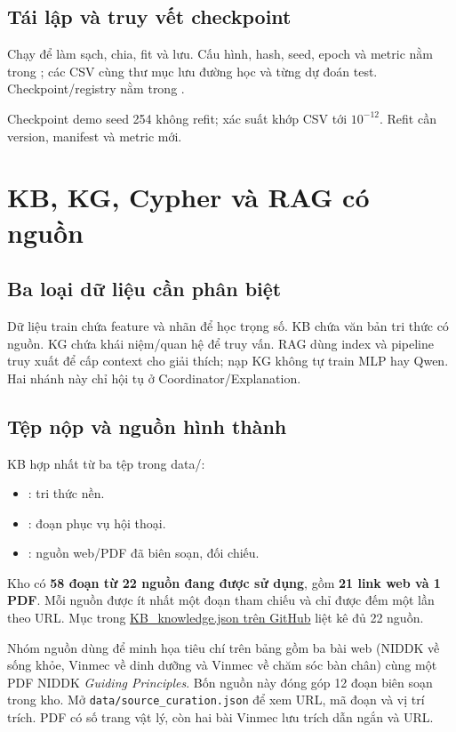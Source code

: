 \section{Tái lập và truy vết checkpoint}
Chạy  để làm sạch, chia, fit và lưu. Cấu hình, hash, seed, epoch và metric nằm trong ; các CSV cùng thư mục lưu đường học và từng dự đoán test. Checkpoint/registry nằm trong .

Checkpoint demo seed 254 không refit; xác suất khớp CSV tới $10^{-12}$. Refit cần version, manifest và metric mới.

\chapter{KB, KG, Cypher và RAG có nguồn}\label{pr:knowledge}
\section{Ba loại dữ liệu cần phân biệt}
Dữ liệu train chứa feature và nhãn để học trọng số. KB chứa văn bản tri thức có nguồn. KG chứa khái niệm/quan hệ để truy vấn. RAG dùng index và pipeline truy xuất để cấp context cho giải thích; nạp KG không tự train MLP hay Qwen. Hai nhánh này chỉ hội tụ ở Coordinator/Explanation.

\section{Tệp nộp và nguồn hình thành}
KB hợp nhất từ ba tệp trong data/:
\begin{itemize}
\item {}: tri thức nền.
\item {}: đoạn phục vụ hội thoại.
\item {}: nguồn web/PDF đã biên soạn, đối chiếu.
\end{itemize}
Kho có \textbf{58 đoạn từ 22 nguồn đang được sử dụng}, gồm \textbf{21 link web và 1 PDF}. Mỗi nguồn được ít nhất một đoạn tham chiếu và chỉ được đếm một lần theo URL. Mục  trong \href{https://github.com/jellalaz/He_Thong_Thong_Minh_Thay_Que/blob/main/exports/KB_KG_RAG/KB_knowledge.json}{KB\_knowledge.json trên GitHub} liệt kê đủ 22 nguồn.

Nhóm nguồn dùng để minh họa tiêu chí trên bảng gồm ba bài web (NIDDK về sống khỏe, Vinmec về dinh dưỡng và Vinmec về chăm sóc bàn chân) cùng một PDF NIDDK \emph{Guiding Principles}. Bốn nguồn này đóng góp 12 đoạn biên soạn trong kho. Mở \nolinkurl{data/source_curation.json} để xem URL, mã đoạn và vị trí trích. PDF có số trang vật lý, còn hai bài Vinmec lưu trích dẫn ngắn và URL.

